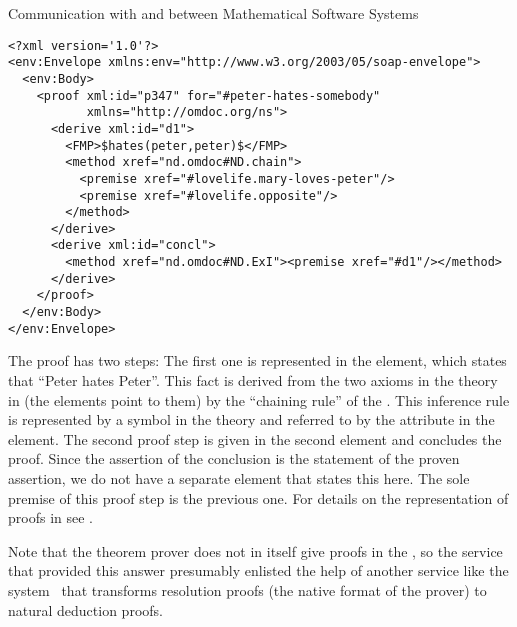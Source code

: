 \begin{tchapter}[id=rpc,short=Communication between Systems]{Communication with and between Mathematical Software Systems}
\begin{lstlisting}[label=lst:rpc-proof,mathescape,
  caption={A proof that Peter hates someone}]
<?xml version='1.0'?>
<env:Envelope xmlns:env="http://www.w3.org/2003/05/soap-envelope">
  <env:Body>
    <proof xml:id="p347" for="#peter-hates-somebody"
           xmlns="http://omdoc.org/ns"> 
      <derive xml:id="d1">
        <FMP>$hates(peter,peter)$</FMP>
        <method xref="nd.omdoc#ND.chain">
          <premise xref="#lovelife.mary-loves-peter"/>
          <premise xref="#lovelife.opposite"/>
        </method>
      </derive>
      <derive xml:id="concl">
        <method xref="nd.omdoc#ND.ExI"><premise xref="#d1"/></method>
      </derive>
    </proof>
  </env:Body>
</env:Envelope>
\end{lstlisting} 
The proof has two steps: The first one is represented in the {} element,
which states that ``Peter hates Peter''. This fact is derived from the two axioms in the
theory {} in {} (the {} elements
point to them) by the ``chaining rule'' of the
{}. This inference rule is represented by a symbol
in the theory {} and referred to by the {} attribute
in the {} element.  The second proof step is given in the second
{} element and concludes the proof. Since the assertion of the conclusion
is the statement of the proven assertion, we do not have a separate {}
element that states this here. The sole premise of this proof step is the previous one.
For details on the representation of proofs in {\omdoc} see {}.

Note that the {\spass} theorem prover does not in itself give proofs in the
{}, so the {\spass} service that provided this
answer presumably enlisted the help of another {\mathwebws} service like the {\tramp}
system~\cite{Meier:sdttom00} that transforms resolution proofs (the native format of the
{\spass} prover) to natural deduction proofs.
\end{tchapter}


